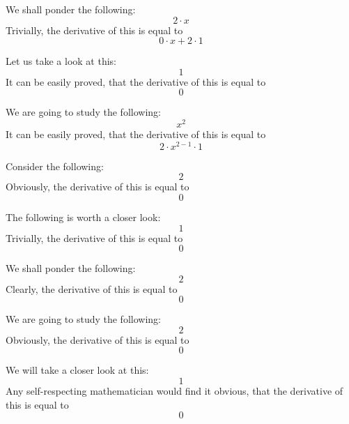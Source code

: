 \documentclass{article}
\begin{document}
We shall ponder the following:
\begin{equation}
2 \cdot x 
\end{equation}
Trivially, the derivative of this is equal to
\begin{equation}
0 \cdot x + 2 \cdot 1 
\end{equation}

Let us take a look at this:
\begin{equation}
1 
\end{equation}
It can be easily proved, that the derivative of this is equal to
\begin{equation}
0 
\end{equation}

We are going to study the following:
\begin{equation}
x ^{2 } 
\end{equation}
It can be easily proved, that the derivative of this is equal to
\begin{equation}
2 \cdot x ^{2 - 1 } \cdot 1 
\end{equation}

Consider the following:
\begin{equation}
2 
\end{equation}
Obviously, the derivative of this is equal to
\begin{equation}
0 
\end{equation}

The following is worth a closer look:
\begin{equation}
1 
\end{equation}
Trivially, the derivative of this is equal to
\begin{equation}
0 
\end{equation}

We shall ponder the following:
\begin{equation}
2 
\end{equation}
Clearly, the derivative of this is equal to
\begin{equation}
0 
\end{equation}

We are going to study the following:
\begin{equation}
2 
\end{equation}
Obviously, the derivative of this is equal to
\begin{equation}
0 
\end{equation}

We will take a closer look at this:
\begin{equation}
1 
\end{equation}
Any self-respecting mathematician would find it obvious, that the derivative of this is equal to
\begin{equation}
0 
\end{equation}
\end{document}
